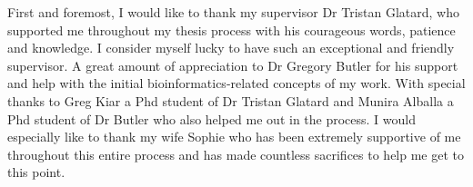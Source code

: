 \begin{acknowledgments}

    First and foremost, I would like to thank my supervisor Dr Tristan Glatard, who supported me 
    throughout my thesis process with his courageous words, patience and knowledge. I consider myself 
    lucky to have such an exceptional and friendly supervisor. A great amount of appreciation to 
    Dr Gregory Butler for his support and help with the initial bioinformatics-related concepts 
    of my work.
    With special thanks to Greg Kiar a Phd student of Dr Tristan Glatard and Munira Alballa a Phd student 
    of Dr Butler who also helped me out in the process. I would especially like to thank my wife Sophie 
    who has been extremely supportive of me throughout this entire process and has made countless 
    sacrifices to help me get to this point.
    
\end{acknowledgments}